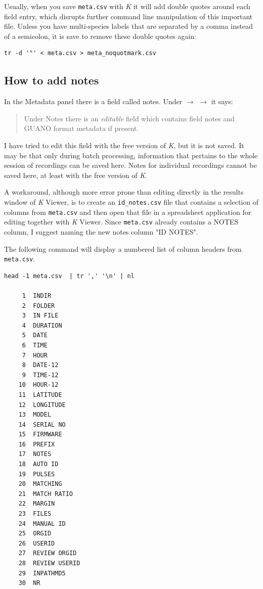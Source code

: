 \documentclass[English, 11pt, twoside, authoryear]{article}
\begin{document}
Usually, when you save \texttt{meta.csv} with \emph{K} it will add double quotes around each field entry, which disrupts further command line manipulation of this important file. Unless you have multi-species labels that are separated by a comma instead of a semicolon, it is save to remove these double quotes again:

\begin{lstlisting}[numbers=none]
tr -d '"' < meta.csv > meta_noquotmark.csv
\end{lstlisting}



%
%
%
\subsection{How to add notes}
%
%
%

In the Metadata panel there is a field called notes. Under  $\rightarrow$  $\rightarrow$  it says:
\begin{quote}
Under Notes there is an \emph{editable} field which contains field notes and GUANO format metadata if present.
\end{quote}
I have tried to edit this field with the free version of \emph{K}, but it is not saved. It may be that only during batch processing, information that pertains to the whole session of recordings can be saved here. Notes for individual recordings cannot be saved here, at least with the free version of \emph{K}.

A workaround, although more error prone than editing directly in the results window of \emph{K} Viewer, is to create an \texttt{id\_notes.csv} file that contains a selection of columns from \texttt{meta.csv} and then open that file in a spreadsheet application for editing together with \emph{K} Viewer. Since \texttt{meta.csv} already contains a NOTES column, I suggest naming the new notes column "ID NOTES".

The following command will display a numbered list of column headers from \texttt{meta.csv}. 

\begin{lstlisting}[numbers=none]
head -1 meta.csv  | tr ',' '\n' | nl

     1	INDIR
     2	FOLDER
     3	IN FILE
     4	DURATION
     5	DATE
     6	TIME
     7	HOUR
     8	DATE-12
     9	TIME-12
    10	HOUR-12
    11	LATITUDE
    12	LONGITUDE
    13	MODEL
    14	SERIAL NO
    15	FIRMWARE
    16	PREFIX
    17	NOTES
    18	AUTO ID
    19	PULSES
    20	MATCHING
    21	MATCH RATIO
    22	MARGIN
    23	FILES
    24	MANUAL ID
    25	ORGID
    26	USERID
    27	REVIEW ORGID
    28	REVIEW USERID
    29	INPATHMD5
    30	NR
\end{lstlisting}
\end{document}
